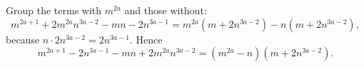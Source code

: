 Group the terms with $m^{2a}$ and those without:
\[
m^{2a+1}+2m^{2a}n^{3a-2}-mn-2n^{3a-1}=m^{2a}\left(m+2n^{3a-2}\right)-n\left(m+2n^{3a-2}\right),
\]
because $n\cdot2n^{3a-2}=2n^{3a-1}$. Hence
\[
m^{2a+1}-2n^{3a-1}-mn+2m^{2a}n^{3a-2}=\boxed{\left(m^{2a}-n\right)\left(m+2n^{3a-2}\right)}.
\]
